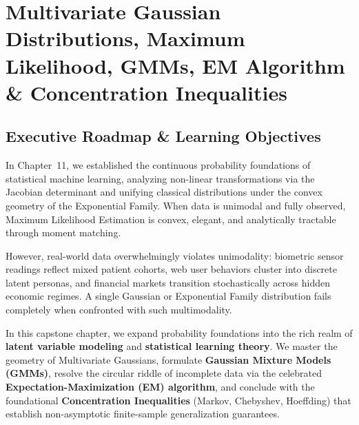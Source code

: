 \chapter[Multivariate Gaussians, GMMs, EM \& Concentration]{Multivariate Gaussian Distributions, Maximum Likelihood, GMMs, EM Algorithm \& Concentration Inequalities}
\label{chap:week12}

\section{Executive Roadmap \& Learning Objectives}

\begin{tcolorbox}[
    colback=primarylight!30,
    colframe=primarydark,
    title={\large \textbf{Architectural Bridge: From Canonical Exponentials to Latent Mixtures \& Concentration Bounds}},
    fonttitle=\bfseries\sffamily,
    arc=3mm,
    boxrule=1pt,
    width=\textwidth
]
In Chapter~11, we established the continuous probability foundations of statistical machine learning, analyzing non-linear transformations via the Jacobian determinant and unifying classical distributions under the convex geometry of the Exponential Family. When data is unimodal and fully observed, Maximum Likelihood Estimation is convex, elegant, and analytically tractable through moment matching.

However, real-world data overwhelmingly violates unimodality: biometric sensor readings reflect mixed patient cohorts, web user behaviors cluster into discrete latent personas, and financial markets transition stochastically across hidden economic regimes. A single Gaussian or Exponential Family distribution fails completely when confronted with such multimodality. 

In this capstone chapter, we expand probability foundations into the rich realm of \textbf{latent variable modeling} and \textbf{statistical learning theory}. We master the geometry of Multivariate Gaussians, formulate \textbf{Gaussian Mixture Models (GMMs)}, resolve the circular riddle of incomplete data via the celebrated \textbf{Expectation-Maximization (EM) algorithm}, and conclude with the foundational \textbf{Concentration Inequalities} (Markov, Chebyshev, Hoeffding) that establish non-asymptotic finite-sample generalization guarantees.
\end{tcolorbox}


